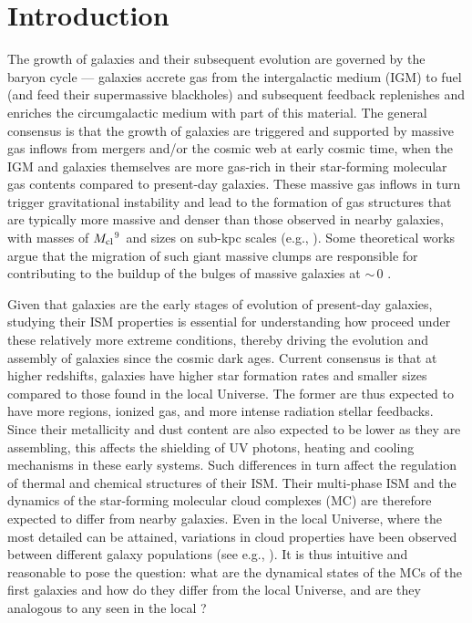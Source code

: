 \IfFileExists{emulateapjlegacy.cls}{\documentclass[iop]{emulateapjlegacy}}{\documentclass[iop]{emulateapj}}
\begin{document}
\section{Introduction}    \label{sec:intro}

The growth of galaxies and their subsequent evolution are governed by the baryon cycle ---
galaxies accrete gas from the intergalactic medium (IGM) to fuel \SF (and feed their supermassive blackholes)
and subsequent feedback replenishes and enriches the circumgalactic medium with part of this material.
The general consensus is that the growth of \highz galaxies are triggered and supported by massive
gas inflows from mergers and/or the cosmic web at early cosmic time, when the IGM and galaxies themselves
are more gas-rich in their star-forming molecular
gas contents compared to present-day galaxies.
These massive gas inflows in turn trigger gravitational instability and lead
to the formation of gas structures that are typically more massive and denser than those
observed in nearby galaxies, with masses of $M_{\rm cl}$$^9$\,\Msun
and sizes on sub-kpc scales (e.g., \citealt{Gabor13a, Hopkins14a, Inoue16a}).
Some theoretical works argue that the
migration of such giant massive clumps are responsible for contributing to the
buildup of the bulges of massive galaxies at \z$\sim$\,0 \citep[e.g.,][]{Ceverino10a}.

Given that \highz galaxies are the early stages of evolution of present-day galaxies, studying their ISM properties is essential for understanding how \SF proceed under these relatively more extreme conditions, thereby driving the evolution and assembly
of galaxies
since the cosmic dark ages.
Current consensus is that at higher redshifts, galaxies have higher
star formation rates \citep[SFR; ][]{Behroozi13b, Sparre15a, Maiolino15a, Dunlop17a} and
smaller sizes \citep[e.g.,][]{Bouwens11a, Ono13a} compared to those found in the local Universe.
The former are thus expected to have more  regions, ionized gas, and more intense radiation stellar feedbacks.
Since their metallicity and dust content are also expected to be lower as they are assembling,
this affects the shielding of UV photons, heating and cooling mechanisms in these early systems. Such differences in turn
affect the regulation of thermal and chemical structures of their ISM.
Their multi-phase ISM and the dynamics of the star-forming molecular cloud complexes (MC)
are therefore expected to differ from nearby galaxies.
Even in the local Universe, where the most detailed \obs can be attained, variations in cloud properties have been
observed between different galaxy populations (see e.g., \citealt{Hughes10a, Hughes13b}).
It is thus intuitive and reasonable to pose the question: what are the dynamical states of the MCs of the first galaxies and
how do they differ from the local Universe, and are they analogous to any seen in the local \galpop?
%
\end{document}
